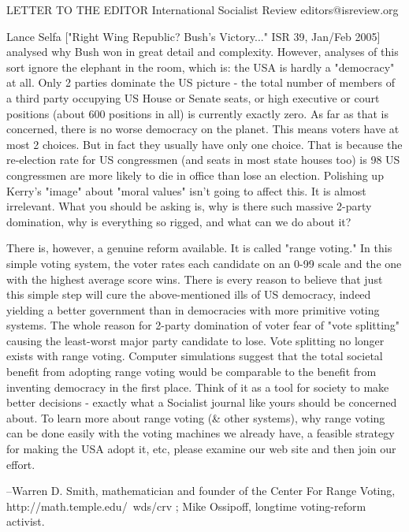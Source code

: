 LETTER TO THE EDITOR   International Socialist Review  editors@isreview.org

Lance Selfa ["Right Wing Republic? Bush's Victory..." ISR 39, Jan/Feb 2005]
analysed why Bush won in great detail and complexity.  However, analyses of this sort 
ignore the elephant in the room, which is: the USA is hardly a "democracy" at all.
Only 2 parties dominate the US picture - the total number of members of
a third party occupying US House or Senate seats, or high executive
or court positions (about 600 positions in all) is currently exactly zero.
As far as that is concerned, there is no worse democracy on the planet.
This means voters have at most 2 choices.  But in fact they usually have only
one choice.  That is because the re-election rate for US congressmen (and
seats in most state houses too) is 98%
US congressmen are more likely to die in office than lose an election.
Polishing up Kerry's "image" about "moral values" isn't going to affect this.
It is almost irrelevant.  What you should be asking is, why is there such massive
2-party domination, why is everything so rigged, and what can we do about it?

There is, however, a genuine reform available.  It is called "range voting."
In this simple voting system, the voter rates each candidate on an 0-99 scale
and the one with the highest average score wins.  There is every reason to believe
that just this simple step will cure the above-mentioned ills of US democracy,
indeed yielding a better government than in democracies with more primitive voting 
systems.  The whole reason for 2-party domination of voter fear of  "vote splitting"
causing the least-worst major party candidate to lose.  Vote splitting no longer exists
with range voting.  Computer simulations suggest that the total societal benefit from
adopting range voting would be comparable to the benefit from inventing democracy in
the first place.  Think of it as a tool for society to make better decisions - exactly
what a Socialist journal like yours should be concerned about.  To learn more
about range voting (& other systems), why range voting can be done easily with the voting
machines we already have, a feasible strategy for making the USA adopt it, etc,
please examine our web site and then join our effort.

--Warren D. Smith, mathematician and founder of the 
Center For Range Voting,   http://math.temple.edu/~wds/crv  ;
Mike Ossipoff, longtime voting-reform activist.


